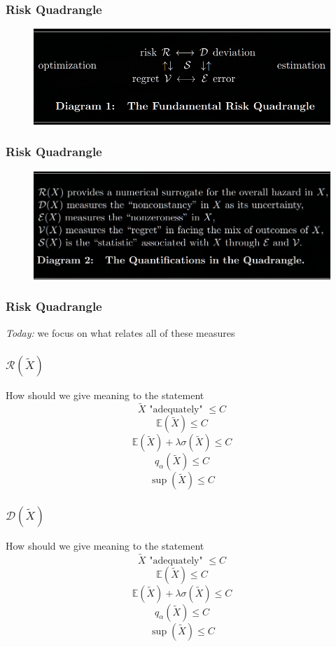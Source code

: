 \documentclass{beamer}
\begin{document}
\begin{frame}
	\frametitle{Risk Quadrangle}
  \vfill
  \begin{figure}[ht]
    \centering
    \includegraphics[width=\textwidth]{./imgs/risk_quadrangle.png}
  \end{figure}
  \vfill
\end{frame}
\begin{frame}
	\frametitle{Risk Quadrangle}
  \vfill
  \begin{figure}[ht]
    \centering
    \includegraphics[width=\textwidth]{./imgs/riskquaddesc.png}
  \end{figure}
  \vfill
\end{frame}

\begin{frame}
\frametitle{Risk Quadrangle}
  \vfill
  \emph{Today:} we focus on what relates all of these measures
  \vfill
\end{frame}

\begin{frame}
  \frametitle{$\mathcal{R}(\tilde{X})$}
  \vfill
  How should we give meaning to the statement
  $$\tilde{X} \text{ "adequately" }\leq C$$
  \vfill
  $$\mathbb{E}(\tilde{X}) \leq C$$
  $$\mathbb{E}(\tilde{X}) + \lambda \sigma(\tilde{X}) \leq C$$
  $$q_\alpha(\tilde{X}) \leq C$$
  $$\sup(\tilde{X}) \leq C$$
\end{frame}

\begin{frame}
  \frametitle{$\mathcal{D}(\tilde{X})$}
  \vfill
  How should we give meaning to the statement
  $$\tilde{X} \text{ "adequately" }\leq C$$
  \vfill
  $$\mathbb{E}(\tilde{X}) \leq C$$
  $$\mathbb{E}(\tilde{X}) + \lambda \sigma(\tilde{X}) \leq C$$
  $$q_\alpha(\tilde{X}) \leq C$$
  $$\sup(\tilde{X}) \leq C$$
\end{frame}
\end{document}
